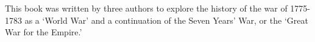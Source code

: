 This book was written by three authors to explore the history of the war of 1775-1783 as a `World War' and a continuation of the Seven Years' War, or the `Great War for the Empire.' 